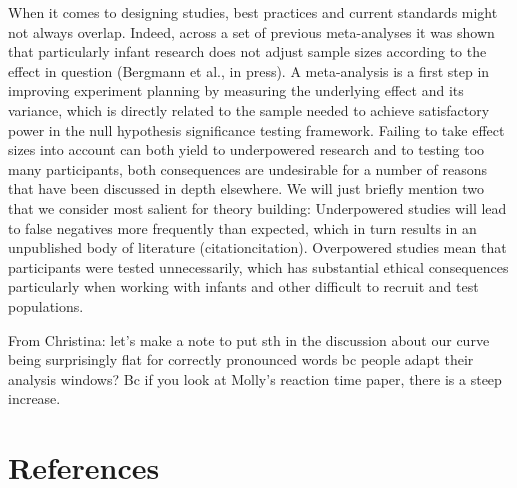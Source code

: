 \documentclass[man]{apa6}
\theoremstyle{definition}
\theoremstyle{definition}
\theoremstyle{definition}
\theoremstyle{remark}
\begin{document}
When it comes to designing studies, best practices and current standards
might not always overlap. Indeed, across a set of previous meta-analyses
it was shown that particularly infant research does not adjust sample
sizes according to the effect in question (Bergmann et al., in press). A
meta-analysis is a first step in improving experiment planning by
measuring the underlying effect and its variance, which is directly
related to the sample needed to achieve satisfactory power in the null
hypothesis significance testing framework. Failing to take effect sizes
into account can both yield to underpowered research and to testing too
many participants, both consequences are undesirable for a number of
reasons that have been discussed in depth elsewhere. We will just
briefly mention two that we consider most salient for theory building:
Underpowered studies will lead to false negatives more frequently than
expected, which in turn results in an unpublished body of literature
(citationcitation). Overpowered studies mean that participants were
tested unnecessarily, which has substantial ethical consequences
particularly when working with infants and other difficult to recruit
and test populations.

From Christina: let's make a note to put sth in the discussion about our
curve being surprisingly flat for correctly pronounced words bc people
adapt their analysis windows? Bc if you look at Molly's reaction time
paper, there is a steep increase.

\newpage

\section{References}\label{references}

\begingroup
\setlength{\parindent}{-0.5in} \setlength{\leftskip}{0.5in}

\hypertarget{refs}{}

\endgroup
\end{document}
